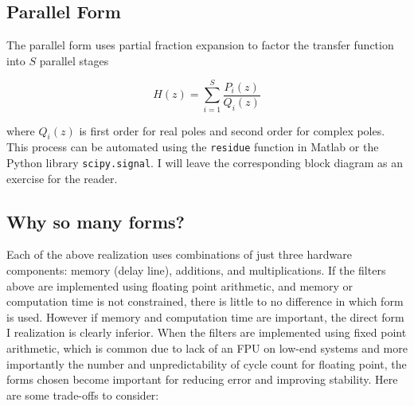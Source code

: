 \documentclass{article}
\begin{document}
\subsection{Parallel Form}

The parallel form uses partial fraction expansion to factor the transfer function into $S$ parallel stages

\[
H(z) = \sum\limits_{i=1}^{S} \frac{P_i(z)}{Q_i(z)}
\]

where $Q_i(z)$ is first order for real poles and second order for complex poles. This process can be automated using the \texttt{residue} function in Matlab or the Python library \texttt{scipy.signal}. I will leave the corresponding block diagram as an exercise for the reader.

\subsection{Why so many forms?}

Each of the above realization uses combinations of just three hardware components: memory (delay line), additions, and multiplications. If the filters above are implemented using floating point arithmetic, and memory or computation time is not constrained, there is little to no difference in which form is used. However if memory and computation time are important, the  direct form I realization is clearly inferior. When the filters are implemented using fixed point arithmetic, which is common due to lack of an FPU on low-end systems and more importantly the number and unpredictability of cycle count for floating point, the forms chosen become important for reducing error and improving stability. Here are some trade-offs to consider:
\end{document}
